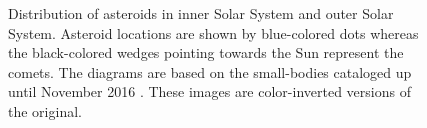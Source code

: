 \begin{figure}[htb]
\centering
\captionsetup{justification=centering}
\caption{Distribution of asteroids in \protect{} inner Solar System and \protect{} outer Solar System. Asteroid locations are shown by blue-colored dots whereas the black-colored wedges pointing towards the Sun represent the comets. The diagrams are based on the small-bodies cataloged up until November 2016 \parencite{jpl_asteroid_web}. These images are color-inverted versions of the original.}
\label{fig:asteroid_distribution}
\end{figure}
\FloatBarrier
